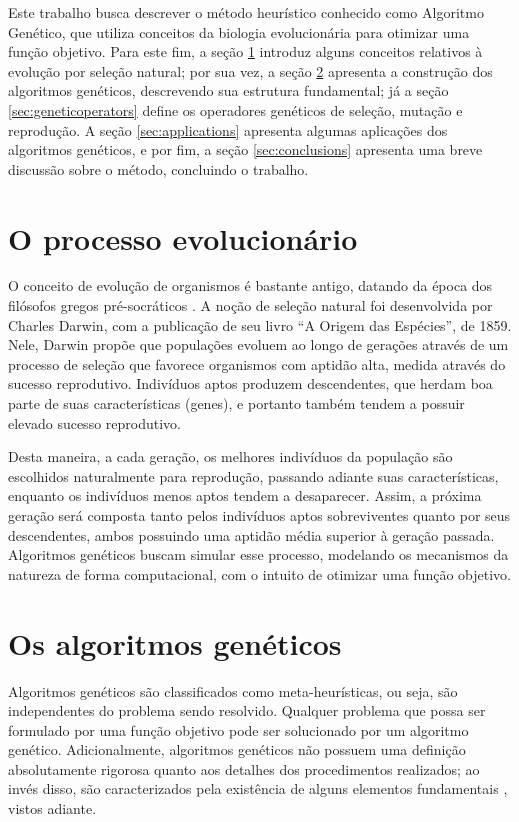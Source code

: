 \documentclass[12pt]{article}
\begin{document}
Este trabalho busca descrever o método heurístico conhecido como Algoritmo Genético, que utiliza conceitos da biologia evolucionária para otimizar uma função objetivo. Para este fim, a seção \ref{sec:introevolution} introduz alguns conceitos relativos à evolução por seleção natural; por sua vez, a seção \ref{sec:algorithm} apresenta a construção dos algoritmos genéticos, descrevendo sua estrutura fundamental; já a seção \ref{sec:geneticoperators} define os operadores genéticos de seleção, mutação e reprodução. A seção \ref{sec:applications} apresenta algumas aplicações dos algoritmos genéticos, e por fim, a seção \ref{sec:conclusions} apresenta uma breve discussão sobre o método, concluindo o trabalho.

\section{O processo evolucionário} \label{sec:introevolution}

O conceito de evolução de organismos é bastante antigo, datando da época dos filósofos gregos pré-socráticos \cite{Hull1967}. A noção de seleção natural  foi desenvolvida por Charles Darwin, com a publicação de seu livro ``A Origem das Espécies'', de 1859. Nele, Darwin propõe que populações evoluem ao longo de gerações através de um processo de seleção que favorece organismos com aptidão alta, medida através do sucesso reprodutivo. Indivíduos aptos produzem descendentes, que herdam boa parte de suas características (genes), e portanto também tendem a possuir elevado sucesso reprodutivo.

Desta maneira, a cada geração, os melhores indivíduos da população são escolhidos naturalmente para reprodução, passando adiante suas características, enquanto os indivíduos menos aptos tendem a desaparecer. Assim, a próxima geração será composta tanto pelos indivíduos aptos sobreviventes quanto por seus descendentes, ambos possuindo uma aptidão média superior à geração passada. Algoritmos genéticos buscam simular esse processo, modelando os mecanismos da natureza de forma computacional, com o intuito de otimizar uma função objetivo.

\section{Os algoritmos genéticos} \label{sec:algorithm}

Algoritmos genéticos são classificados como meta-heurísticas, ou seja, são independentes do problema sendo resolvido. Qualquer problema que possa ser formulado por uma função objetivo pode ser solucionado por um algoritmo genético. Adicionalmente, algoritmos genéticos não possuem uma definição absolutamente rigorosa quanto aos detalhes dos procedimentos realizados; ao invés disso, são caracterizados pela existência de alguns elementos fundamentais \cite{Mitchell1998}, vistos adiante.
\end{document}
